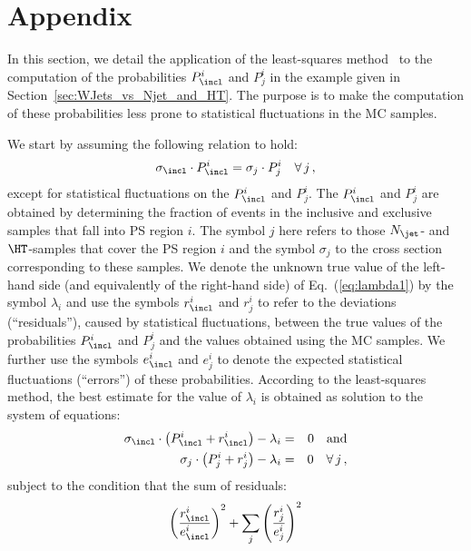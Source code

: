 \section{Appendix}
\label{sec:appendix}

In this section, we detail the application of the least-squares method~\cite{Cowan:1998ji}
to the computation of the probabilities $P_{\incl}^{i}$ and $P_{j}^{i}$
in the example given in Section~\ref{sec:WJets_vs_Njet_and_HT}.
The purpose is to make the computation of these probabilities less prone to statistical fluctuations in the MC samples.

We start by assuming the following relation to hold:
\begin{equation}
\sigma_{\incl} \cdot P_{\incl}^{i} = \sigma_{j} \cdot P_{j}^{i} \quad \forall \, j \, ,
\label{eq:lambda1}
\end{equation}
except for statistical fluctuations on the $P_{\incl}^{i}$ and $P_{j}^{i}$.
The $P_{\incl}^{i}$ and $P_{j}^{i}$ are obtained by determining the fraction of events in the inclusive and exclusive samples that fall into PS region $i$.
The symbol $j$ here refers to those $N_{\jet}$- and $\HT$-samples that cover the PS region $i$
and the symbol $\sigma_{j}$ to the cross section corresponding to these samples.
We denote the unknown true value of the left-hand side (and equivalently of the right-hand side) of Eq.~(\ref{eq:lambda1}) by the symbol $\lambda_{i}$
and use the symbols $r_{\incl}^{i}$ and $r_{j}^{i}$ to refer to the deviations (``residuals''), caused by statistical fluctuations,
between the true values of the probabilities $P_{\incl}^{i}$ and $P_{j}^{i}$ and the values obtained using the MC samples.
We further use the symbols $e_{\incl}^{i}$ and $e_{j}^{i}$ to denote the expected statistical fluctuations (``errors'') of these probabilities.
According to the least-squares method,
the best estimate for the value of $\lambda_{i}$ is obtained as solution to the system of equations:
\begin{eqnarray*}
\sigma_{\incl} \cdot \left( P_{\incl}^{i} + r_{\incl}^{i} \right) - \lambda_{i} & = & 0 \quad \mbox{and} \\
\sigma_{j} \cdot \left( P_{j}^{i} + r_{j}^{i} \right) - \lambda_{i} & = & 0 \quad \forall \, j \, ,
\end{eqnarray*}
subject to the condition that the sum of residuals:
\begin{equation*}
\left( \frac{r_{\incl}^{i}}{e_{\incl}^{i}} \right)^{2} + \sum_{j} \left( \frac{r_{j}^{i}}{e_{j}^{i}} \right)^{2}
\end{equation*}
